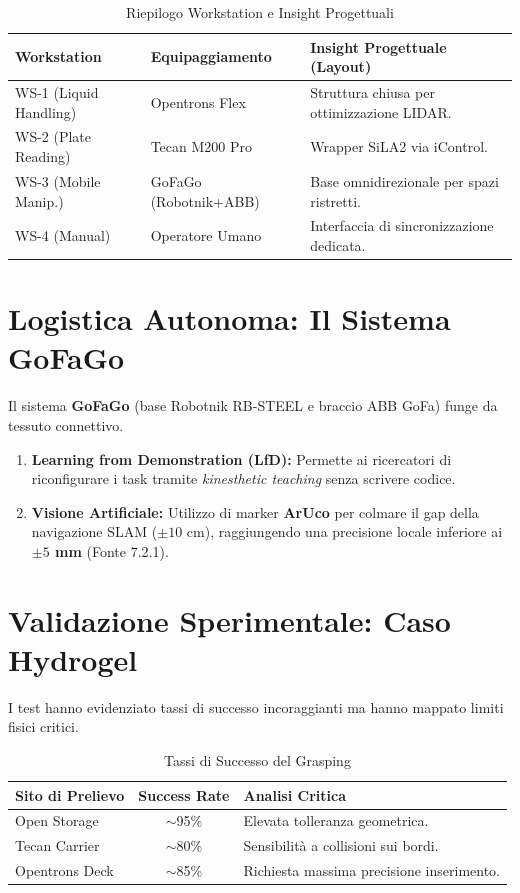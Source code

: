 \documentclass[a4paper,11pt]{article}
\begin{document}
	\begin{table}[h]
		\centering
		\caption{Riepilogo Workstation e Insight Progettuali}
		\vspace{2mm}
		\begin{tabular}{@{}lll@{}}
			\toprule
			\textbf{Workstation} & \textbf{Equipaggiamento} & \textbf{Insight Progettuale (Layout)} \\ \midrule
			WS-1 (Liquid Handling) & Opentrons Flex & Struttura chiusa per ottimizzazione LIDAR. \\
			WS-2 (Plate Reading) & Tecan M200 Pro & Wrapper SiLA2 via iControl. \\
			WS-3 (Mobile Manip.) & GoFaGo (Robotnik+ABB) & Base omnidirezionale per spazi ristretti. \\
			WS-4 (Manual) & Operatore Umano & Interfaccia di sincronizzazione dedicata. \\ \bottomrule
		\end{tabular}
	\end{table}
	
	\section{Logistica Autonoma: Il Sistema GoFaGo}
	Il sistema \textbf{GoFaGo} (base Robotnik RB-STEEL e braccio ABB GoFa) funge da tessuto connettivo. 
	\begin{enumerate}
		\item \textbf{Learning from Demonstration (LfD):} Permette ai ricercatori di riconfigurare i task tramite \textit{kinesthetic teaching} senza scrivere codice.
		\item \textbf{Visione Artificiale:} Utilizzo di marker \textbf{ArUco} per colmare il gap della navigazione SLAM ($\pm 10$ cm), raggiungendo una precisione locale inferiore ai \textbf{$\pm 5$ mm} (Fonte 7.2.1).
	\end{enumerate}
	
	\section{Validazione Sperimentale: Caso Hydrogel}
	I test hanno evidenziato tassi di successo incoraggianti ma hanno mappato limiti fisici critici.
	
	\begin{table}[h]
		\centering
		\caption{Tassi di Successo del Grasping}
		\vspace{2mm}
		\begin{tabular}{@{}lcl@{}}
			\toprule
			\textbf{Sito di Prelievo} & \textbf{Success Rate} & \textbf{Analisi Critica} \\ \midrule
			Open Storage & $\sim$95\% & Elevata tolleranza geometrica. \\
			Tecan Carrier & $\sim$80\% & Sensibilità a collisioni sui bordi. \\
			Opentrons Deck & $\sim$85\% & Richiesta massima precisione inserimento. \\ \bottomrule
		\end{tabular}
	\end{table}
	
\end{document}
